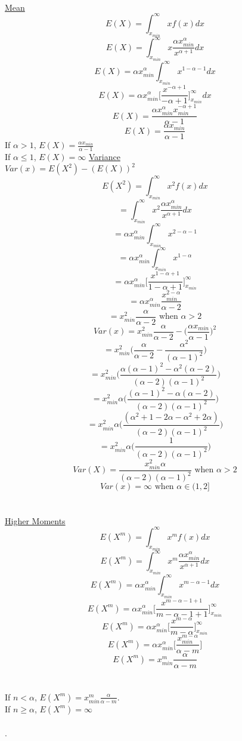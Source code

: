 \documentclass[14pt, a4paper]{article}
\theoremstyle{definition}
\begin{document}
\\ \underline{Mean}
\[ E(X) = \int^\infty _{x_{min}} x f(x) dx\]
\[ E(X) = \int^\infty _{x_{min}} x \frac{\alpha x_{min}^\alpha}{x^{\alpha+1}} dx\]
\[ E(X) = \alpha x_{min}^\alpha \int^\infty _{x_{min}} x^{1 - \alpha - 1} dx\]
\[ E(X) = \alpha x_{min}^\alpha \Big[ \frac{x^{- \alpha +1}}{-\alpha + 1} \Big]^\infty_{x_{min}} dx\]
\[ E(X) =  \frac{\alpha x_{min}^\alpha x_{min}^{-\alpha + 1}}{\alpha - 1} \]
\[ E(X) = \frac{\alpha x_{min}}{\alpha - 1} \]
If $\alpha > 1$, $E(X) = \frac{\alpha x_{min}}{\alpha - 1} $ 
\\ If $\alpha \leq 1$, $E(X) = \infty$
\underline{Variance}
\\ $Var(x) = E(X^2) - (E(X))^2$
\[ E(X^2)  = \int^\infty_{x_{min}} x^2 f(x) dx\]
\[ = \int^\infty_{x_{min}} x^2 \frac{\alpha x_{min}^\alpha}{x^{\alpha+1}} dx\]
\[ = \alpha x_{min}^\alpha \int^\infty_{x_{min}} x^{2-\alpha-1} \]
\[ = \alpha x_{min}^\alpha \int^\infty_{x_{min}} x^{1-\alpha} \]
\[ = \alpha x_{min}^\alpha \Big[ \frac{x^{1-\alpha+1}}{1-\alpha+1} \Big]^\infty_{x_{min}} \]
\[ = \alpha x_{min}^\alpha \frac{x_{min}^{2-\alpha}}{\alpha - 2}  \]
\[ = x_{min}^2 \frac{\alpha}{\alpha-2}  \text{ when } \alpha > 2 \]
\[ Var(x) = x_{min}^2 \frac{\alpha}{\alpha-2} - \Big( \frac{\alpha x_{min}}{\alpha - 1} \Big)^2 \]
\[ = x^2_{min} \Big( \frac{\alpha}{\alpha-2} - \frac{\alpha^2}{(\alpha - 1)^2} \Big) \]
\[ = x^2_{min} \Big( \frac{\alpha(\alpha - 1)^2 - \alpha^2(\alpha-2)}{(\alpha - 2)(\alpha - 1)^2} \Big) \]
\[ = x^2_{min} \alpha \Big( \frac{(\alpha - 1)^2 - \alpha(\alpha-2)}{(\alpha - 2)(\alpha - 1)^2} \Big)\]
\[ = x^2_{min} \alpha \Big( \frac{(\alpha^2 + 1 - 2 \alpha - \alpha^2 + 2 \alpha )}{(\alpha - 2)(\alpha - 1)^2} \Big)\]
\[ = x^2_{min} \alpha \Big( \frac{1}{(\alpha - 2)(\alpha - 1)^2} \Big)\]
\[ Var(X) = \frac{x^2_{min} \alpha }{(\alpha - 2)(\alpha - 1)^2} \text{ when } \alpha > 2\]
\[ Var(x) = \infty \text{ when } \alpha \in (1,2] \]
\\
\\ \underline{Higher Moments}
\[ E (X^m) = \int^\infty_{x_{min}} x^m  f(x) dx\]
\[ E (X^m) = \int^\infty_{x_{min}} x^m \frac{\alpha x_{min}^\alpha}{x^{\alpha+1}} dx\]
\[ E (X^m) = \alpha x_{min}^\alpha \int^\infty_{x_{min}} x^{m - \alpha -1} dx\]
\[ E (X^m) = \alpha x_{min}^\alpha \Big[ \frac{x^{m - \alpha -1+1}}{m - \alpha -1+1} \Big]^\infty_{x_{min}} \]
\[ E (X^m) = \alpha x_{min}^\alpha \Big[ \frac{x^{m - \alpha}}{m - \alpha} \Big]^\infty_{x_{min}} \]
\[ E (X^m) = \alpha x_{min}^\alpha \Big[ \frac{x_{min}^{m - \alpha}}{\alpha - m} \Big] \]
\[ E (X^m) = x_{min}^m \frac{\alpha}{\alpha - m}  \]
\\
\\ If $n< \alpha$, $E (X^m) = x_{min}^m \frac{\alpha}{\alpha - m}$.
\\ If $n \geq \alpha $, $E(X^m) = \infty$
\\
\\ .
\end{document}
